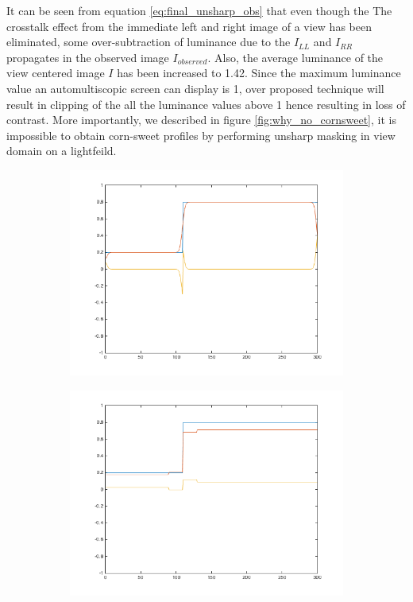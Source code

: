 It can be seen from equation \ref{eq:final_unsharp_obs} that even though the The crosstalk effect from the immediate left and right image of a view has been eliminated, some over-subtraction of luminance due to the $I_{LL}$ and $I_{RR}$ propagates in the observed image $I_{observed}$. Also, the average luminance of the view centered image $I$ has been increased to 1.42. Since the maximum luminance value an automultiscopic screen can display is 1, over proposed technique will result in clipping of the all the luminance values above 1 hence resulting in loss of contrast. More importantly, we described in figure \ref{fig:why_no_cornsweet}, it is impossible to obtain corn-sweet profiles by performing unsharp masking in view domain on a lightfeild.

\begin{figure}[htbp]
    \centering
    \begin{subfigure}[b]{0.48\textwidth}
        \includegraphics[width=\textwidth]{./Template_Figures/unsharp_proper}
        \caption{}\label{fig:cornsweet}
    \end{subfigure}
    \begin{subfigure}[b]{0.48\textwidth}
        \includegraphics[width=\textwidth]{./Template_Figures/unsharp_epipolar}
        \caption{}\label{fig:no_cornsweet}
    \end{subfigure}


\end{figure}
